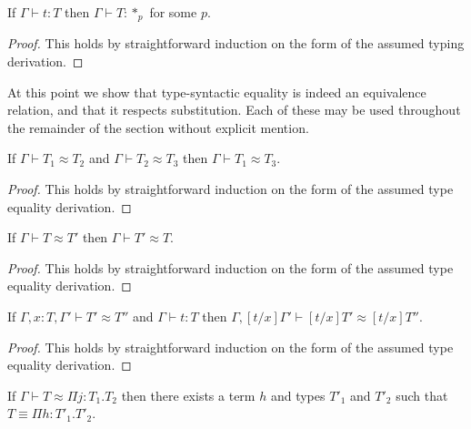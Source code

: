 \begin{lemma}[Regularity]
  If $\Gamma \vdash t:T$ then $\Gamma \vdash T:*_p$ for some $p$.
  \label{lemma:regularity_ssfe}
\end{lemma}
\begin{proof}
  This holds by straightforward induction on the form of the assumed
  typing derivation.
\end{proof}
\noindent
At this point we show that type-syntactic equality is indeed an
equivalence relation, and that it respects substitution.  Each of
these may be used throughout the remainder of the section without
explicit mention.
\begin{lemma}
  \label{lemma:transitivity_of_type_equality_ssfe}
  If $\Gamma \vdash T_1 \approx T_2$ and $\Gamma \vdash T_2 \approx T_3$ then
  $\Gamma \vdash T_1 \approx T_3$.
\end{lemma}
\begin{proof}
  This holds by straightforward induction on the form of the assumed
  type equality derivation.
\end{proof}
\begin{lemma}
  \label{lemma:symmetry_of_type_equality}
  If $\Gamma \vdash T \approx T'$ then $\Gamma \vdash T' \approx T$.
\end{lemma}
\begin{proof}
  This holds by straightforward induction on the form of the assumed
  type equality derivation.
\end{proof}
\begin{lemma}
  \label{lemma:substitution_for_type_equality_ssfe}
  If $\Gamma,x:T,\Gamma' \vdash T' \approx T''$ and $\Gamma \vdash t:T$ then
  $\Gamma,[t/x]\Gamma' \vdash [t/x]T' \approx [t/x]T''$.
\end{lemma}
\begin{proof}
  This holds by straightforward induction on the form of the assumed
  type equality derivation.
\end{proof}
\begin{lemma}[]
  \label{lemma:pis_are_equal_to_pis_ssfe}
  If $\Gamma \vdash T \approx \Pi j:T_1.T_2$ then there exists a term $h$ and types $T'_1$ and $T'_2$
  such that $T \equiv \Pi h:T'_1.T'_2$.
\end{lemma}
